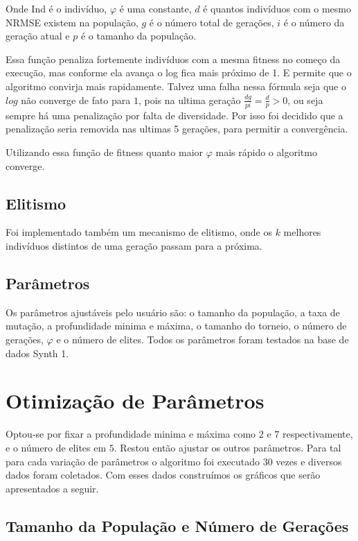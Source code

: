 \documentclass[10pt,twocolumn,letterpaper]{article}
\begin{document}
Onde Ind é o indivíduo, $\varphi$ é uma constante, $d$ é quantos indivíduos com o mesmo NRMSE existem na população, $g$ é o número total de gerações, $i$ é o número da geração atual e $p$ é o tamanho da população.

Essa função penaliza fortemente indivíduos com a mesma fitness no começo da execução, mas conforme ela avança o log fica mais próximo de 1. E permite que o algoritmo convirja mais rapidamente. Talvez uma falha nessa fórmula seja que o $log$ não converge de fato para $1$, pois na ultima geração $\frac{dg}{pi} = \frac{d}{p} > 0$, ou seja sempre há uma penalização por falta de diversidade. Por isso foi decidido que a penalização seria removida nas ultimas 5 gerações, para permitir a convergência.

Utilizando essa função de fitness quanto maior $\varphi$ mais rápido o algoritmo converge.

\subsection{Elitismo}

Foi implementado também um mecanismo de elitismo, onde os $k$ melhores indivíduos distintos de uma geração passam para a próxima.

\subsection{Parâmetros}

Os parâmetros ajustáveis pelo usuário são: o tamanho da população, a taxa de mutação, a profundidade minima e máxima, o tamanho do torneio, o número de gerações, $\varphi$ e o número de elites. Todos os parâmetros foram testados na base de dados Synth 1.

\section{Otimização de Parâmetros}

Optou-se por fixar a profundidade minima e máxima como $2$ e $7$ respectivamente, e o número de elites em $5$. Restou então ajustar os outros parâmetros. Para tal para cada variação de parâmetros o algoritmo foi executado $30$ vezes e diversos dados foram coletados. Com esses dados construímos os gráficos que serão apresentados a seguir.


\subsection{Tamanho da População e Número de Gerações}
\end{document}
